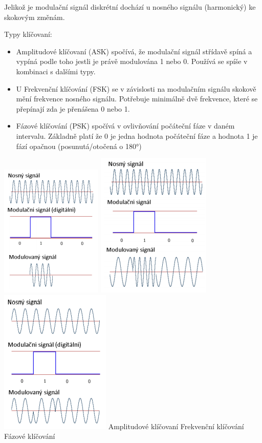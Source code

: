 Jelikož je modulační signál diskrétní dochází u nosného signálu (harmonický) ke skokovým změnám. 

Typy klíčovaní:

\begin{itemize}[noitemsep]
    \item Amplitudové klíčovaní (ASK) spočívá, že modulační signál střídavě spíná a vypíná podle toho jestli je právě modulována 1 nebo 0. Používá se spíše v kombinaci s dalšími typy. 
    \item U Frekvenční klíčování (FSK) se v závislosti na modulačním signálu skokově mění frekvence nosného signálu. Potřebuje minimálně dvě frekvence, které se přepínají zda je přenášena 0 nebo 1.
    \item Fázové klíčování (PSK) spočívá v ovlivňování počáteční fáze v daném intervalu. Základně platí že 0 je jedna hodnota počáteční fáze a hodnota 1 je fází opačnou (posunutá/otočená o 180°)
\end{itemize}

\includegraphics[scale=0.75]{images/-019.png}
\includegraphics[scale=0.75]{images/-020.png}
\includegraphics[scale=0.75]{images/-021.png}
Amplitudové klíčovaní \hspace{2cm} Frekvenční klíčování \hspace{2cm} Fázové klíčování


